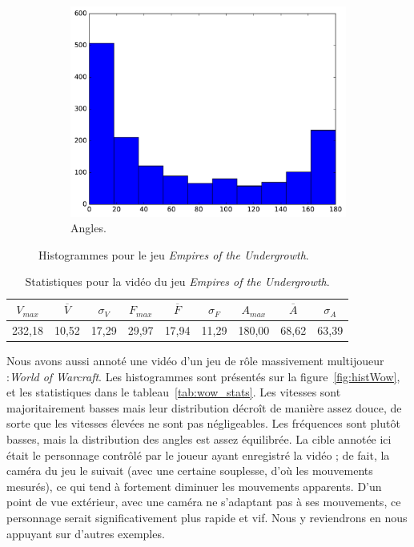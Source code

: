 \begin{figure}[!htbp]
\begin{subfigure}[t]{\subImgWclicks}
			\includegraphics[width=\textwidth]{figures/ch3/spider_angle}
			\caption{Angles.}
			\label{fig:spider_angle}
		\end{subfigure}
		\caption[Histogrammes pour le jeu \emph{Empires of the Undergrowth}]{Histogrammes pour le jeu \emph{Empires of the Undergrowth}.}
		\label{fig:histSpider}
	\end{figure}

\begin{table}
	\centering
	\begin{tabular}{c c c c c c c c c}
		$V_{max}$	& $\overline{V}$	& $\sigma_{V}$	& $F_{max}$	& $\overline{F}$	& $\sigma_{F}$	& $A_{max}$	& $\overline{A}$	& $\sigma_{A}$	\bigstrut[b] \\ \hline

		232,18		& 10,52				& 17,29			& 29,97		& 17,94				& 11,29			& 180,00	& 68,62				& 63,39			\bigstrut[t] \\
	\end{tabular}
	\caption[Statistiques pour la vidéo du jeu \emph{Empires of the Undergrowth}]{Statistiques pour la vidéo du jeu \emph{Empires of the Undergrowth}.}
	\label{tab:spider_stats}
\end{table}
	
	Nous avons aussi annoté une vidéo d'un jeu de rôle massivement multijoueur :\emph{World of Warcraft}. Les histogrammes sont présentés sur la figure~\ref{fig:histWow}, et les statistiques dans le tableau~\ref{tab:wow_stats}. Les vitesses sont majoritairement basses mais leur distribution décroît de manière assez douce, de sorte que les vitesses élevées ne sont pas négligeables. Les fréquences sont plutôt basses, mais la distribution des angles est assez équilibrée. La cible annotée ici était le personnage contrôlé par le joueur ayant enregistré la vidéo ; de fait, la caméra du jeu le suivait (avec une certaine souplesse, d'où les mouvements mesurés), ce qui tend à fortement diminuer les mouvements apparents. D'un point de vue extérieur, avec une caméra ne s'adaptant pas à ses mouvements, ce personnage serait significativement plus rapide et vif. Nous y reviendrons en nous appuyant sur d'autres exemples.

